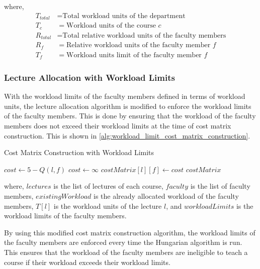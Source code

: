 where,
\begin{align*}
  T_{total} & = \text{Total workload units of the department}               \\
  T_c       & = \text{Workload units of the course } c                      \\
  R_{total} & = \text{Total relative workload units of the faculty members} \\
  R_f       & = \text{Relative workload units of the faculty member } f     \\
  T_f       & = \text{Workload units limit of the faculty member } f
\end{align*}

\subsubsection{Lecture Allocation with Workload Limits}

With the workload limits of the faculty members defined in terms of workload units, the lecture allocation algorithm is modified to enforce the workload limits of the faculty members. This is done by ensuring that the workload of the faculty members does not exceed their workload limits at the time of cost matrix construction. This is shown in \autoref{alg:workload_limit_cost_matrix_construction}.

\begin{algorithm}[H]
  \caption{Cost Matrix Construction with Workload Limits}
  \begin{algorithmic}[1]
    \State $cost \gets 5 - Q(l, f)$
    \Else
    \State $cost \gets \infty$
    \EndIf
    \State $costMatrix[l][f] \gets cost$
    \EndFor
    \EndFor
    \Return $costMatrix$
    \EndProcedure
  \end{algorithmic}
  \label{alg:workload_limit_cost_matrix_construction}
\end{algorithm}

where, \(lectures\) is the list of lectures of each course, \(faculty\) is the list of faculty members, \(existingWorkload\) is the already allocated workload of the faculty members, \(T[l]\) is the workload units of the lecture \(l\), and \(workloadLimits\) is the workload limits of the faculty members.

By using this modified cost matrix construction algorithm, the workload limits of the faculty members are enforced every time the Hungarian algorithm is run. This ensures that the workload of the faculty members are ineligible to teach a course if their workload exceeds their workload limits.

